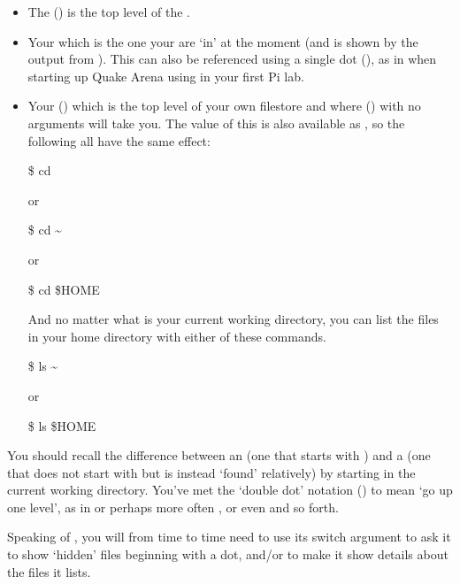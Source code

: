 \begin{itemize}
\item The  (\ttout{/}) is the top level of the
.

\item Your  which is the one your are `in'
at the moment (and is shown by the output from ). This can also
be referenced using a single dot (), as in when starting up Quake Arena using 
 in your first Pi lab. 

\item Your  (\ttout{\tilde}) which is the top level of
your own filestore and where  () with no
arguments will take you.  The value of this is also available as
, so the following all have the same effect:

\begin{ttoutenv}
\$  cd
\end{ttoutenv}
or
\begin{ttoutenv}
\$  cd \textasciitilde 
\end{ttoutenv}
or
\begin{ttoutenv}
\$  cd \$HOME
\end{ttoutenv}

And no matter what is your current working directory, you can list the files
in your home directory with either of these commands.

\begin{ttoutenv}
\$  ls \textasciitilde
\end{ttoutenv}
or
\begin{ttoutenv}
\$  ls \$HOME 
\end{ttoutenv}

\end{itemize}

You should recall the difference between an  (one
that starts with \ttout{/}) and a  (one that does not
start with \ttout{/} but is instead `found' relatively) by starting in the
current working directory. You've met the `double dot' notation
() to mean `go up one level', as in  or perhaps more
often , or even  and so forth.

Speaking of , you will from time to time need to use its
 switch argument to ask it to show `hidden' files beginning with a dot,
and/or  to make it show details about the files it lists.


